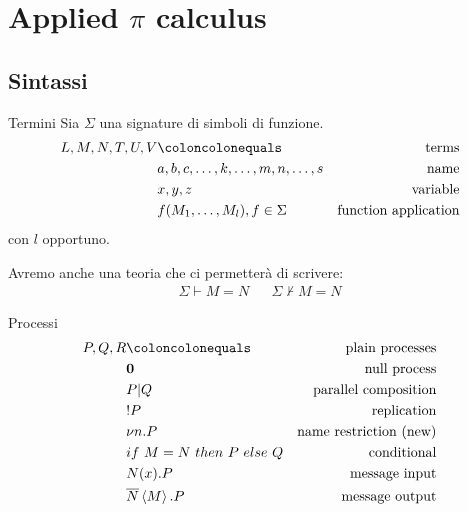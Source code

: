 \documentclass{beamer}
\theoremstyle{plain}
\theoremstyle{definition}
\theoremstyle{remark}
\newcommand{\obar}[1]{\overline{#1}}
\begin{document}
\section{Applied $\pi$ calculus}

\subsection{Sintassi}

\begin{frame}{Termini}
  Sia $\Sigma$ una signature di simboli di funzione.  
  \begin{align*}
    L,M,N,T,U,V & \coloncolonequals & \text{terms} \\
                & a,b,c,\dots,k,\dots,m,n,\dots,s & \text{name} \\
                & x,y,z & \text{variable} \\
                & f(M_1,\dots,M_l), f\in \Sigma & \text{function application}
  \end{align*}
  con $l$ opportuno.

  Avremo anche una teoria che ci permetter\`a di scrivere:
  \begin{align*}
    \Sigma \vdash M = N & & \Sigma \not\vdash M = N
  \end{align*}
\end{frame}

\begin{frame}{Processi}
  \begin{align*}
  P,Q,R & \coloncolonequals & \text{plain processes} \\
  & \mathbf{0} & \text{null process} \\
  & P | Q & \text{parallel composition} \\
  & !P & \text{replication} \\
  & \nu n.P & \text{name restriction (new)} \\
  & if\ M=N\ then\ P\ else\ Q & \text{conditional} \\
  & N(x).P & \text{message input} \\
  & \obar{N}\left< M\right> .P & \text{message output}
\end{align*}

\end{frame}
\end{document}
